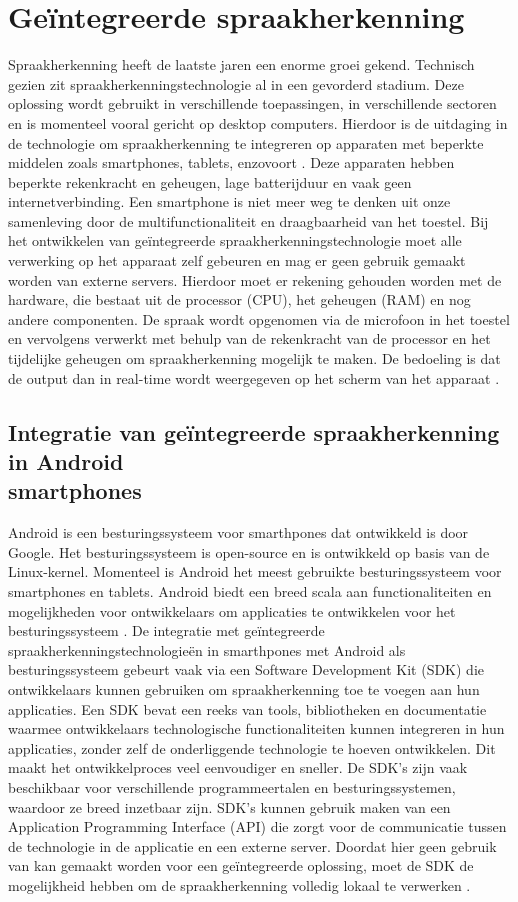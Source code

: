 \section{Geïntegreerde spraakherkenning}
Spraakherkenning heeft de laatste jaren een enorme groei gekend. Technisch gezien zit spraakherkenningstechnologie al in een gevorderd stadium. Deze oplossing wordt gebruikt in verschillende toepassingen, in verschillende sectoren en is momenteel vooral gericht op desktop computers. Hierdoor is de uitdaging in de technologie om spraakherkenning te integreren op apparaten met beperkte middelen zoals smartphones, tablets, enzovoort \autocite{Tan2008}. Deze apparaten hebben beperkte rekenkracht en geheugen, lage batterijduur en vaak geen internetverbinding. Een smartphone is niet meer weg te denken uit onze samenleving door de multifunctionaliteit en draagbaarheid van het toestel. Bij het ontwikkelen van geïntegreerde spraakherkenningstechnologie moet alle verwerking op het apparaat zelf gebeuren en mag er geen gebruik gemaakt worden van externe servers. Hierdoor moet er rekening gehouden worden met de hardware, die bestaat uit de processor (CPU), het geheugen (RAM) en nog andere componenten. De spraak wordt opgenomen via de microfoon in het toestel en vervolgens verwerkt met behulp van de rekenkracht van de processor en het tijdelijke geheugen om spraakherkenning mogelijk te maken. De bedoeling is dat de output dan in real-time wordt weergegeven op het scherm van het apparaat \autocite{Yehui2016}.

\subsection{Integratie van geïntegreerde spraakherkenning in Android \\smartphones}
Android is een besturingssysteem voor smarthpones dat ontwikkeld is door Google. Het besturingssysteem is open-source en is ontwikkeld op basis van de Linux-kernel. Momenteel is Android het meest gebruikte besturingssysteem voor smartphones en tablets. Android biedt een breed scala aan functionaliteiten en mogelijkheden voor ontwikkelaars om applicaties te ontwikkelen voor het besturingssysteem \autocite{Karch2021}. De integratie met geïntegreerde spraakherkenningstechnologieën in smarthpones met Android als besturingssysteem gebeurt vaak via een Software Development Kit (SDK) die ontwikkelaars kunnen gebruiken om spraakherkenning toe te voegen aan hun applicaties. Een SDK bevat een reeks van tools, bibliotheken en documentatie waarmee ontwikkelaars technologische functionaliteiten kunnen integreren in hun applicaties, zonder zelf de onderliggende technologie te hoeven ontwikkelen. Dit maakt het ontwikkelproces veel eenvoudiger en sneller. De SDK's zijn vaak beschikbaar voor verschillende programmeertalen en besturingssystemen, waardoor ze breed inzetbaar zijn. SDK's kunnen gebruik maken van een Application Programming Interface (API) die zorgt voor de communicatie tussen de technologie in de applicatie en een externe server. Doordat hier geen gebruik van kan gemaakt worden voor een geïntegreerde oplossing, moet de SDK de mogelijkheid hebben om de spraakherkenning volledig lokaal te verwerken \autocite{Fitzgerald2023}. 

